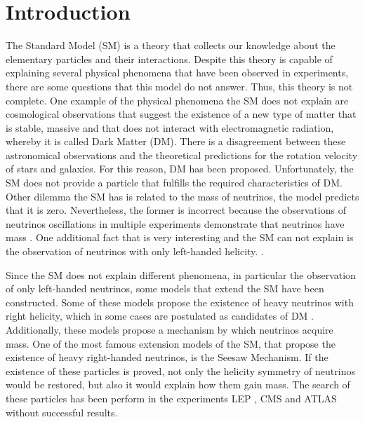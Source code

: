 \chapter{Introduction}
\label{Introduction_chapter}

The Standard Model (SM) is a theory that collects our knowledge about the elementary particles and their interactions. Despite this theory is capable of explaining several physical phenomena that have been observed in experiments, there are some questions that this model do not answer. Thus, this theory is not complete. One example of the physical phenomena the SM does not explain are cosmological observations that suggest the existence of a new type of matter that is stable, massive and that does not interact with electromagnetic radiation, whereby it is called Dark Matter (DM). There is a disagreement between these astronomical observations and the theoretical predictions for the rotation velocity of stars and galaxies. For this reason, DM has been proposed. Unfortunately, the SM does not provide a particle that fulfills the required characteristics of DM. Other dilemma the SM has is related to the mass of neutrinos, the model predicts that it is zero. Nevertheless, the former is incorrect because the observations of neutrinos oscillations in multiple experiments demonstrate that neutrinos have mass \cite{Neutrino experiment 1 mass, Neutrino experiment 2 mass}. One additional fact that is very interesting and the SM can not explain is the observation of neutrinos with only left-handed helicity. . 

Since the SM does not explain different phenomena, in particular the observation of only left-handed neutrinos, some models that extend the SM have been constructed. Some of these models propose the existence of heavy neutrinos with right helicity, which in some cases are postulated as candidates of DM \cite{Neutrino dark matter candidate 1, Neutrino dark matter candidate 2}. Additionally, these models propose a mechanism by which neutrinos acquire mass. One of the most famous extension models of the SM, that propose the existence of heavy right-handed neutrinos, is the Seesaw Mechanism. If the existence of these particles is proved, not only the helicity symmetry of neutrinos would be restored, but also it would explain how them gain mass. The search of these particles has been perform in the experiments LEP \cite{Lep experiment}, CMS \cite{CMS experiment} and ATLAS \cite{ATLAS experiment} without successful results.

